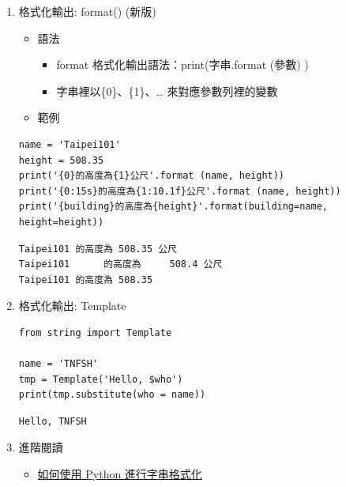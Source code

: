 \documentclass[a4paper,12pt]{article}
\begin{document}
\begin{enumerate}
\begin{itemize}
\begin{verbatim}
台北 101 的高度為 508 公尺，參觀門票為   18.24 美金.
台北 101 的高度為 508 公尺，參觀門票為 18.24 美金.
\end{verbatim}
\end{itemize}
\item 格式化輸出: format() (新版)
\label{sec:org38b2bc0}
\begin{itemize}
\item 語法\\
\begin{itemize}
\item format 格式化輸出語法：print(字串.format (參數) ) \\
\item 字串裡以\{0\}、\{1\}、\ldots{} 來對應參數列裡的變數\\
\end{itemize}

\item 範例\\
\end{itemize}
\lstset{breaklines=true,language=Python,label= ,caption= ,captionpos=b,firstnumber=1,numbers=left}
\begin{lstlisting}
name = 'Taipei101'
height = 508.35
print('{0}的高度為{1}公尺'.format (name, height))
print('{0:15s}的高度為{1:10.1f}公尺'.format (name, height))
print('{building}的高度為{height}'.format(building=name, height=height))
\end{lstlisting}

\begin{verbatim}
Taipei101 的高度為 508.35 公尺
Taipei101      的高度為     508.4 公尺
Taipei101 的高度為 508.35
\end{verbatim}
\item 格式化輸出: Template
\label{sec:orgb1b0f79}
\lstset{breaklines=true,language=Python,label= ,caption= ,captionpos=b,firstnumber=1,numbers=left}
\begin{lstlisting}
from string import Template

name = 'TNFSH'
tmp = Template('Hello, $who')
print(tmp.substitute(who = name))

\end{lstlisting}

\begin{verbatim}
Hello, TNFSH
\end{verbatim}

\item 進階閱讀
\label{sec:org4b72b69}
\begin{itemize}
\item \href{https://blog.techbridge.cc/2019/05/03/how-to-use-python-string-format-method/}{如何使用 Python 進行字串格式化}\\
\end{itemize}
\end{enumerate}
\end{document}
